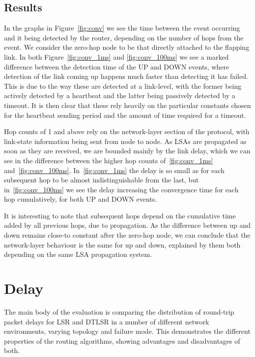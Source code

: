 \documentclass[withindex,glossary,openany]{cam-thesis}
\begin{document}
\subsection{Results}

In the graphs in Figure~\ref{fig:conv} we see the time between the event occurring and it being detected by the router, depending on the number of hops from the event. We consider the zero-hop node to be that directly attached to the flapping link. In both Figure~\ref{fig:conv_1ms} and \ref{fig:conv_100ms} we see a marked difference between the detection time of the UP and DOWN events, where detection of the link coming up happens much faster than detecting it has failed. This is due to the way these are detected at a link-level, with the former being actively detected by a heartbeat and the latter being passively detected by a timeout. It is then clear that these rely heavily on the particular constants chosen for the heartbeat sending period and the amount of time required for a timeout.

Hop counts of 1 and above rely on the network-layer section of the protocol, with link-state information being sent from node to node. As LSAs are propagated as soon as they are received, we are bounded mainly by the link delay, which we can see in the difference between the higher hop counts of~\ref{fig:conv_1ms} and~\ref{fig:conv_100ms}. In~\ref{fig:conv_1ms} the delay is so small as for each subsequent hop to be almost indistinguishable from the last, but in~\ref{fig:conv_100ms} we see the delay increasing the convergence time for each hop cumulatively, for both UP and DOWN events.

It is interesting to note that subsequent hops depend on the cumulative time added by all previous hops, due to propagation. As the difference between up and down remains close-to constant after the zero-hop node, we can conclude that the network-layer behaviour is the same for up and down, explained by them both depending on the same LSA propagation system.


\section{Delay}

The main body of the evaluation is comparing the distribution of round-trip packet delays for LSR and DTLSR in a number of different network environments, varying topology and failure mode. This demonstrates the different properties of the routing algorithms, showing advantages and disadvantages of both.
\end{document}
